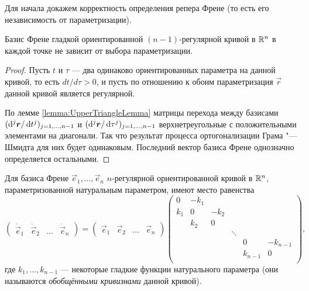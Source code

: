 Для начала докажем корректность определения репера Френе (то есть его независимость от параметризации).

\begin{proposition}
	Базис Френе гладкой ориентированной $(n - 1)$-регулярной кривой в $\mathbb{R}^n$ в каждой точке не зависит от выбора параметризации.
\end{proposition}

\begin{proof}
	Пусть $t$ и $\tau$ --- два одинаково ориентированных параметра на данной кривой, то есть $dt / d\tau > 0$, и пусть по отношению к обоим параметризация $\vec{r}$ данной кривой является регулярной.

	По лемме \ref{lemma:UpperTriangleLemma} матрицы перехода между базисами $(\mathop{}\!\mathrm{d}^j\boldsymbol{r} / \mathop{}\!\mathrm{d} t^j)_{j = 1, \ldots, {n - 1}}$ и $(\mathop{}\!\mathrm{d}^j\boldsymbol{r} / \mathop{}\!\mathrm{d}\tau^j)_{j = 1, \ldots, {n - 1}}$ верхнетреугольные с положительными элементами на диагонали. Так что результат процесса ортогонализации Грама "---Шмидта для них будет одинаковым. Последний вектор базиса Френе однозначно определяется остальными.
\end{proof}

\begin{theorem} \label{theorem:CurveRn}
	Для базиса Френе $\vec{e}_1, \ldots, \vec{e}_n$ $n$-регулярной ориентированной кривой в $\mathbb{R}^n$, параметризованной натуральным параметром, имеют место равенства
	\[
		\begin{pmatrix}
			\dot{\vec{e}}_1 & \dot{\vec{e}}_2 & \ldots & \dot{\vec{e}}_n
		\end{pmatrix} =
		\begin{pmatrix}
			\vec{e}_1 & \vec{e}_2 & \ldots & \vec{e}_n
		\end{pmatrix}
		\begin{pmatrix}
			0 & -k_1 & & & & \\
			k_1 & 0 & -k_2 & & & \\
			 & k_2 & 0 & & & \\
			 & & & \ddots & & \\
			 & & & & 0 & -k_{n - 1}\\
			 & & & & k_{n - 1} & 0\\
		\end{pmatrix},
	\]
	где $k_1, \ldots, k_{n - 1}$ --- некоторые гладкие функции натурального параметра (они называются \textit{обобщёнными кривизнами} данной кривой).
\end{theorem}

